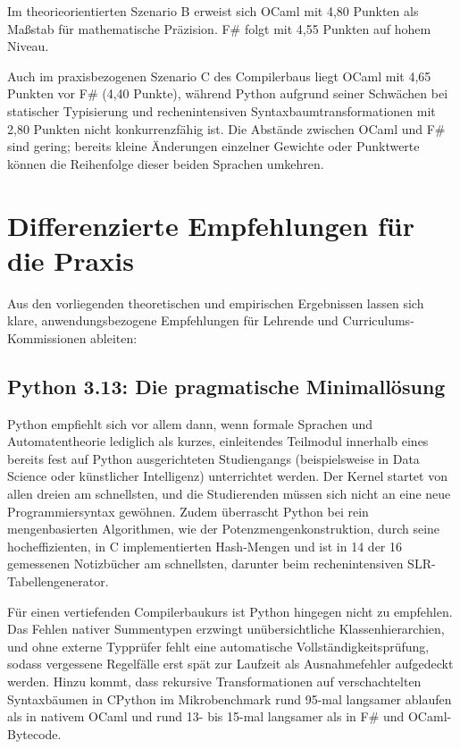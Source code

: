 Im theorieorientierten Szenario B erweist sich OCaml mit 4,80 Punkten als Maßstab für mathematische Präzision.
F\# folgt mit 4,55 Punkten auf hohem Niveau.

Auch im praxisbezogenen Szenario C des Compilerbaus liegt OCaml mit 4,65 Punkten vor F\# (4,40 Punkte), während Python aufgrund seiner Schwächen bei statischer Typisierung und rechenintensiven Syntaxbaumtransformationen mit 2,80 Punkten nicht konkurrenzfähig ist.
Die Abstände zwischen OCaml und F\# sind gering; bereits kleine Änderungen einzelner Gewichte oder Punktwerte können die Reihenfolge dieser beiden Sprachen umkehren.

\section{Differenzierte Empfehlungen für die Praxis}
\label{sec:recommendation_cases}

Aus den vorliegenden theoretischen und empirischen Ergebnissen lassen sich klare, anwendungsbezogene Empfehlungen für Lehrende und Curriculums-Kommissionen ableiten:

\subsection{Python 3.13: Die pragmatische Minimallösung}
Python empfiehlt sich vor allem dann, wenn formale Sprachen und Automatentheorie lediglich als kurzes, einleitendes Teilmodul innerhalb eines bereits fest auf Python ausgerichteten Studiengangs (beispielsweise in Data Science oder künstlicher Intelligenz) unterrichtet werden.
Der Kernel startet von allen dreien am schnellsten, und die Studierenden müssen sich nicht an eine neue Programmiersyntax gewöhnen.
Zudem überrascht Python bei rein mengenbasierten Algorithmen, wie der Potenzmengenkonstruktion, durch seine hocheffizienten, in C implementierten Hash-Mengen und ist in 14 der 16 gemessenen Notizbücher am schnellsten, darunter beim rechenintensiven SLR-Tabellengenerator.

Für einen vertiefenden Compilerbaukurs ist Python hingegen nicht zu empfehlen.
Das Fehlen nativer Summentypen erzwingt unübersichtliche Klassenhierarchien, und ohne externe Typprüfer fehlt eine automatische Vollständigkeitsprüfung, sodass vergessene Regelfälle erst spät zur Laufzeit als Ausnahmefehler aufgedeckt werden.
Hinzu kommt, dass rekursive Transformationen auf verschachtelten Syntaxbäumen in CPython im Mikrobenchmark rund 95-mal langsamer ablaufen als in nativem OCaml und rund 13- bis 15-mal langsamer als in F\# und OCaml-Bytecode.

